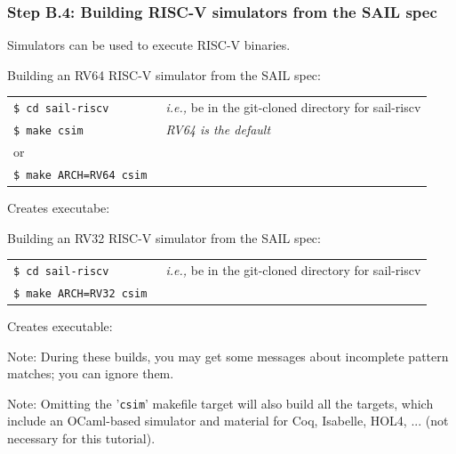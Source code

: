 \documentclass[aspectratio=169]{beamer}
\newcommand{\hm}{\hspace*{1em}}
\newcommand{\hmmm}{\hspace*{3em}}
\begin{document}
\begin{frame}
  \frametitle{Step B.4: Building RISC-V simulators from the SAIL spec}

  {\small Simulators can be used to execute RISC-V binaries.}

  \begin{block}{Building an RV64 RISC-V simulator from the SAIL spec:}
    \scriptsize
    \begin{tabular}{ll}
      \tt \$ cd sail-riscv \hmmm & \emph{i.e.,} be in the git-cloned directory for sail-riscv \\
      \tt \$ make  csim          & \emph{RV64 is the default} \\
      or \\
      \tt \$ make  ARCH=RV64  csim
    \end{tabular}

    \vspace*{1ex}

    Creates executabe: \hm {\tt c\_emulator/riscv\_sim\_RV64}
  \end{block}

  \begin{block}{Building an RV32 RISC-V simulator from the SAIL spec:}
    \scriptsize
    \begin{tabular}{ll}
      \tt \$ cd sail-riscv \hmmm & \emph{i.e.,} be in the git-cloned directory for sail-riscv \\
      \tt \$ make  ARCH=RV32  csim
    \end{tabular}

    \vspace*{1ex}

    Creates executable: \hm {\tt c\_emulator/riscv\_sim\_RV32}
  \end{block}

  {\tiny Note: During these builds, you may get some messages about
    incomplete pattern matches; you can ignore them.}

  {\tiny Note: Omitting the '{\tt csim}' makefile target will also
    build all the targets, which include an OCaml-based simulator and
    material for Coq, Isabelle, HOL4, ... (not necessary for this
    tutorial).}

\end{frame}

\end{document}
